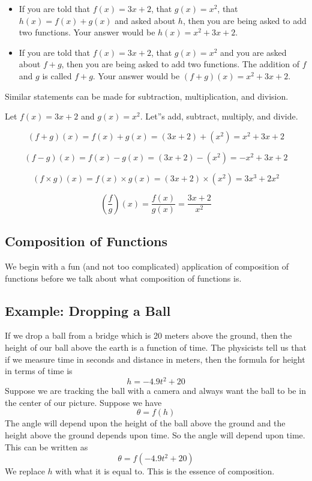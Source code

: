 \begin{itemize}
    \item If you are told that $f(x) = 3x + 2$, that $g(x) = x^2$, that $h(x) = f(x) + g(x)$ and asked about $h$, then you are being asked to add two functions. Your answer would be $h(x) = x^2 + 3x + 2$.
    \item If you are told that $f(x) = 3x + 2$, that $g(x) = x^2$ and you are asked about $f + g$, then you are being asked to add two functions. The addition of $f$ and $g$ is called $f + g$. Your answer would be $(f + g)(x) = x^2 + 3x + 2$.
\end{itemize}

Similar statements can be made for subtraction, multiplication, and division.

Let $f(x) = 3x + 2$ and $g(x) = x^2$. Let''s add, subtract, multiply, and divide.

\[
(f + g)(x) = f(x) + g(x) = (3x + 2) + (x^2) = x^2 + 3x + 2
\]

\[
(f - g)(x) = f(x) - g(x) = (3x + 2) - (x^2) = -x^2 + 3x + 2
\]

\[
(f \times g)(x) = f(x) \times g(x) = (3x + 2) \times (x^2) = 3x^3 + 2x^2
\]

\[
\left(\frac{f}{g}\right)(x) = \frac{f(x)}{g(x)} = \frac{3x + 2}{x^2}
\]

\subsection{Composition of Functions}
\label{sss:comp-37f3}

We begin with a fun (and not too complicated) application of composition of functions
before we talk about what composition of functions is.

\subsection{Example: Dropping a Ball}
\label{sss:exam-c784}

If we drop a ball from a bridge which is 20 meters above the ground, then the height of
our ball above the earth is a function of time. The physicists tell us that if we measure
time in seconds and distance in meters, then the formula for height in terms of time is
\[
h = -4.9t^2 + 20
\]
Suppose we are tracking the ball with a camera and always want the ball to be in the
center of our picture. Suppose we have
\[
\theta = f(h)
\]
The angle will depend upon the height of the ball above the ground and the height above
the ground depends upon time. So the angle will depend upon time. This can be written as
\[
\theta = f(-4.9t^2 + 20)
\]
We replace $h$ with what it is equal to. This is the essence of composition.

